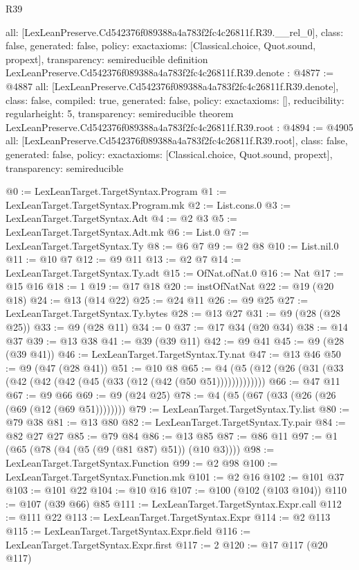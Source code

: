 \begin{lexlean}{R39}
\begin{coremodule}
{  all: [LexLeanPreserve.Cd542376f089388a4a783f2fc4c26811f.R39.__rel_0],
  class: false,
  generated: false,
  policy: exact{axioms: [Classical.choice, Quot.sound, propext]},
  transparency: semireducible
}
definition LexLeanPreserve.Cd542376f089388a4a783f2fc4c26811f.R39.denote : @4877 := @4887 {
  all: [LexLeanPreserve.Cd542376f089388a4a783f2fc4c26811f.R39.denote],
  class: false,
  compiled: true,
  generated: false,
  policy: exact{axioms: []},
  reducibility: regular{height: 5},
  transparency: semireducible
}
theorem LexLeanPreserve.Cd542376f089388a4a783f2fc4c26811f.R39.root : @4894 := @4905 {
  all: [LexLeanPreserve.Cd542376f089388a4a783f2fc4c26811f.R39.root],
  class: false,
  generated: false,
  policy: exact{axioms: [Classical.choice, Quot.sound, propext]},
  transparency: semireducible
}

@0 := LexLeanTarget.TargetSyntax.Program
@1 := LexLeanTarget.TargetSyntax.Program.mk
@2 := List.cons.{0}
@3 := LexLeanTarget.TargetSyntax.Adt
@4 := @2 @3
@5 := LexLeanTarget.TargetSyntax.Adt.mk
@6 := List.{0}
@7 := LexLeanTarget.TargetSyntax.Ty
@8 := @6 @7
@9 := @2 @8
@10 := List.nil.{0}
@11 := @10 @7
@12 := @9 @11
@13 := @2 @7
@14 := LexLeanTarget.TargetSyntax.Ty.adt
@15 := OfNat.ofNat.{0}
@16 := Nat
@17 := @15 @16
@18 := 1
@19 := @17 @18
@20 := instOfNatNat
@22 := @19 (@20 @18)
@24 := @13 (@14 @22)
@25 := @24 @11
@26 := @9 @25
@27 := LexLeanTarget.TargetSyntax.Ty.bytes
@28 := @13 @27
@31 := @9 (@28 (@28 @25))
@33 := @9 (@28 @11)
@34 := 0
@37 := @17 @34 (@20 @34)
@38 := @14 @37
@39 := @13 @38
@41 := @39 (@39 @11)
@42 := @9 @41
@45 := @9 (@28 (@39 @41))
@46 := LexLeanTarget.TargetSyntax.Ty.nat
@47 := @13 @46
@50 := @9 (@47 (@28 @41))
@51 := @10 @8
@65 := @4 (@5 (@12 (@26 (@31 (@33 (@42 (@42 (@42 (@45 (@33 (@12 (@42 (@50 @51)))))))))))))
@66 := @47 @11
@67 := @9 @66
@69 := @9 (@24 @25)
@78 := @4 (@5 (@67 (@33 (@26 (@26 (@69 (@12 (@69 @51))))))))
@79 := LexLeanTarget.TargetSyntax.Ty.list
@80 := @79 @38
@81 := @13 @80
@82 := LexLeanTarget.TargetSyntax.Ty.pair
@84 := @82 @27 @27
@85 := @79 @84
@86 := @13 @85
@87 := @86 @11
@97 := @1 (@65 (@78 (@4 (@5 (@9 (@81 @87) @51)) (@10 @3))))
@98 := LexLeanTarget.TargetSyntax.Function
@99 := @2 @98
@100 := LexLeanTarget.TargetSyntax.Function.mk
@101 := @2 @16
@102 := @101 @37
@103 := @101 @22
@104 := @10 @16
@107 := @100 (@102 (@103 @104))
@110 := @107 (@39 @66) @85
@111 := LexLeanTarget.TargetSyntax.Expr.call
@112 := @111 @22
@113 := LexLeanTarget.TargetSyntax.Expr
@114 := @2 @113
@115 := LexLeanTarget.TargetSyntax.Expr.field
@116 := LexLeanTarget.TargetSyntax.Expr.first
@117 := 2
@120 := @17 @117 (@20 @117)

\end{coremodule}
\end{lexlean}

